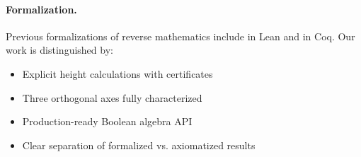 \documentclass[11pt]{article}
\theoremstyle{plain}
\theoremstyle{definition}
\begin{document}
\paragraph{Formalization.} Previous formalizations of reverse mathematics include \cite{LeanRM2023} in Lean and \cite{CoqRM2022} in Coq. Our work is distinguished by:
\begin{itemize}
\item Explicit height calculations with certificates
\item Three orthogonal axes fully characterized
\item Production-ready Boolean algebra API
\item Clear separation of formalized vs. axiomatized results
\end{itemize}

\end{document}
